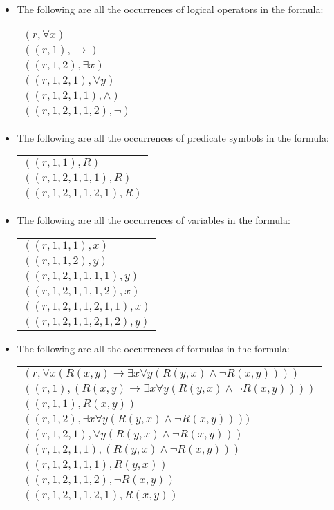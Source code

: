 \begin{enumerate}[\thesection.1]
		\begin{itemize}
		
			\item The following are all the occurrences of logical operators in the formula:
			
				\begin{longtable}{l}
					$(r,\forall x)$\\
					$((r,1),\to)$\\
					$((r,1,2),\exists x)$\\
					$((r,1,2,1),\forall y)$\\
					$((r,1,2,1,1),\land)$\\
					$((r,1,2,1,1,2),\neg)$
				\end{longtable}

				
			\item The following are all the occurrences of predicate symbols in the formula:
				
				\begin{longtable}{l}
					$((r,1,1),R)$\\
					$((r,1,2,1,1,1),R)$\\
					$((r,1,2,1,1,2,1),R)$
				\end{longtable}

			\item The following are all the occurrences of variables in the formula:
				
				\begin{longtable}{l}		
					$((r,1,1,1),x)$\\
					$((r,1,1,2),y)$\\
					$((r,1,2,1,1,1,1),y)$\\
					$((r,1,2,1,1,1,2),x)$\\
					$((r,1,2,1,1,2,1,1),x)$\\
					$((r,1,2,1,1,2,1,2),y)$
				\end{longtable}
				
				\item The following are all the occurrences of formulas in the formula:
				\begin{longtable}{l}		
					$(r,\forall x(R(x,y)\to \exists x\forall y(R(y,x)\land \neg R(x,y))))$\\
					$((r,1),(R(x,y)\to \exists x\forall y(R(y,x)\land \neg R(x,y))))$\\
					$((r,1,1),R(x,y))$\\
					$((r,1,2),\exists x\forall y(R(y,x)\land \neg R(x,y))))$\\
					$((r,1,2,1),\forall y(R(y,x)\land \neg R(x,y)))$\\
					$((r,1,2,1,1),(R(y,x)\land \neg R(x,y)))$\\
					$((r,1,2,1,1,1),R(y,x))$\\
					$((r,1,2,1,1,2),\neg R(x,y))$\\
					$((r,1,2,1,1,2,1),R(x,y))$\\
					
				\end{longtable}
				
				
			\end{itemize}

\end{enumerate}

